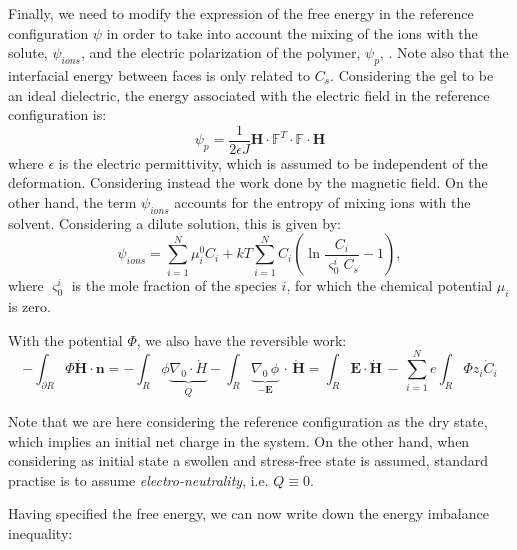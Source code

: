 \documentclass[12pt]{extarticle}
\newcommand{\F}{\ensuremath{\mathbb{F}}}
\begin{document}
Finally, we need to modify the expression of the free energy in the reference configuration $\psi$ in order to take into account the mixing of the ions with the solute, $\psi_{ions}$, and the electric polarization of the polymer, $\psi_p$, \cite{reviewpolyel}. Note also that the interfacial energy between faces is only related to $C_s$. Considering the gel to be an ideal dielectric, the energy associated with the electric field in the reference configuration is:
\begin{equation}
\psi_p= \frac{1}{2\epsilon J} \mathbf{H} \cdot \F^T \cdot \F \cdot \mathbf{H}
\end{equation}
where $\epsilon$ is the electric permittivity, which is assumed to be independent of the deformation. Considering instead the work done by the magnetic field. On the other hand, the term $\psi_{ions}$ accounts for the entropy of mixing ions with the solvent. Considering a dilute solution, this is given by:
\begin{equation}
\psi_{ions} = \sum\limits_{i=1}^{N} \mu^0_i C_i + k T \sum\limits_{i=1}^{N} C_i \left(\ln \frac{C_i}{\varsigma^i_0 C_s}-1\right),
\end{equation}
where $\varsigma^i_0$ is the mole fraction of the species $i$, for which the chemical potential $\mu_i$ is zero. 

With the potential $\Phi$, we also have the reversible work:
\begin{equation*}
-\int_{\partial R} \Phi \dot{\mathbf{H}}\cdot \mathbf{n} = -\int_R \phi \underbrace{\nabla_0 \cdot \dot{H}}_{\dot{Q}} - \int_R \underbrace{\nabla_0 \,\phi}_{-\mathbf{E}} \,\cdot \,\dot{\mathbf{H}}= \int_R \mathbf{E}\cdot \dot{\mathbf{H}} \, - \, \sum\limits_{i=1}^{N} e  \int_R  \Phi  z_i \dot{C}_i
\end{equation*}

Note that we are here considering the reference configuration as the dry state, which implies an initial net charge in the system. On the other hand, when considering as initial state a swollen and stress-free state is assumed, standard practise is to assume \textit{electro-neutrality}, i.e. $Q\equiv0$. 

Having specified the free energy, we can now write down the energy imbalance inequality:
\end{document}
